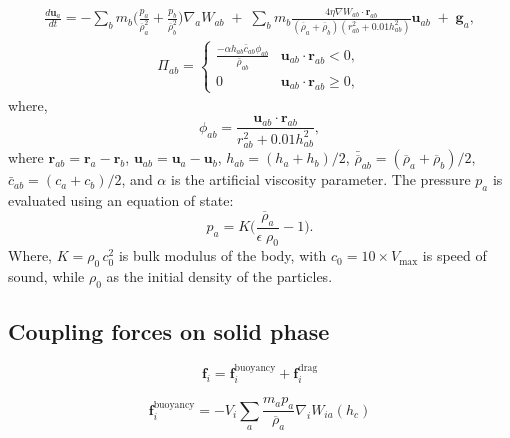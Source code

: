 \documentclass[preprint,12pt]{elsarticle}
\newcommand{\ten}[1]{\ensuremath{\mathbf{#1}}}
\begin{document}
\begin{multline}
  \label{eq:sph-momentum-fluid}
  \frac{d\ten{u}_{a}}{dt} = - \sum_{b} m_b
  \bigg(\frac{p_a}{\overline{\rho}_a^2} + \frac{p_b}{\overline{\rho}_b^2}\bigg)
  \nabla_{a} W_{ab}
 \;+\;
  \sum_{b} m_b \frac{4 \eta \nabla W_{ab}\cdot
    \ten{r}_{ab}}{(\overline{\rho}_a + \overline{\rho}_b) (r_{ab}^2 + 0.01 h_{ab}^2)} \ten{u}_{ab}  \;+\;
  \ten{g}_{a},
\end{multline}
\begin{align}
  \label{eq:mom-av}
  \Pi_{ab} =
  \begin{cases}
\frac{-\alpha h_{ab} \bar{c}_{ab} \phi_{ab}}{\bar{\rho}_{ab}}
  & \ten{u}_{ab}\cdot \ten{r}_{ab} < 0, \\
  0 & \ten{u}_{ab}\cdot \ten{r}_{ab} \ge 0,
\end{cases}
\end{align}
where,
%
\begin{equation}
  \label{eq:av-phiij}
  \phi_{ab} = \frac{\ten{u}_{ab} \cdot \ten{r}_{ab}}{r^2_{ab} + 0.01 h^2_{ab}},
\end{equation}
%
where $\ten{r}_{ab} = \ten{r}_a - \ten{r}_b$,
$\ten{u}_{ab} = \ten{u}_a - \ten{u}_b$, $h_{ab} = (h_a + h_b)/2$,
$\bar{\overline{\rho}}_{ab} = (\overline{\rho}_a + \overline{\rho}_b)/2$, $\bar{c}_{ab} = (c_a + c_b) / 2$, and
$\alpha$ is the artificial viscosity parameter.  The pressure $p_a$ is evaluated
using an equation of state:
\begin{equation}
\label{eqn:sph-eos}
  p_a = K \bigg(\frac{\overline{\rho}_a}{\epsilon \; \rho_{0}} - 1 \bigg).
\end{equation}
Where, $K=\rho_0 \, c_0^2$ is bulk modulus of the body, with
$c_0=10 \times V_{\text{max}}$ is speed of sound, while $\rho_0$ as the
initial density of the particles.



\FloatBarrier%
\subsection{Coupling forces on solid phase}
\label{sec:solid-fluid-coupling-force}

\begin{equation}
\label{eqn:sph-eos}
  \ten{f}_i = \ten{f}_i^{\text{buoyancy}} + \ten{f}_i^{\text{drag}}
\end{equation}

\begin{equation}
\label{eqn:f-buoyancy}
  \ten{f}_i^{\text{buoyancy}} = - V_i \sum_{a}
  \frac{m_a p_a}{\overline{\rho}_a}
  \nabla_{i} W_{ia} (h_c)
\end{equation}
\end{document}
